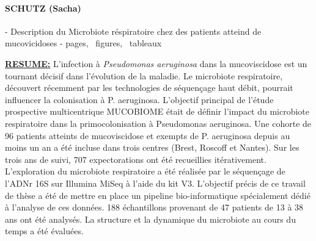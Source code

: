 \documentclass[12pt,a4paper]{article}
\begin{document}
{%



\clearpage


\newpage
\pagestyle{empty}

\noindent
\centering

\begin{minipage}[t][2cm]{15cm}
\paragraph{SCHUTZ (Sacha)} - Description du Microbiote réspiratoire chez des patients atteind de mucovicidoses - \pageref{LastPage} pages, \totalfigures\ figures, \totaltables\ tableaux \\
\end{minipage}


\begin{minipage}[t][9.5cm]{15cm}
\textbf{\underline{RESUME:}}
L'infection à \textit{Pseudomonas aeruginosa} dans la mucoviscidose est un tournant décisif dans l'évolution de la maladie. Le microbiote respiratoire, découvert récemment par les technologies de séquençage haut débit, pourrait influencer la colonisation à P. aeruginosa. 
L'objectif principal de l'étude prospective multicentrique MUCOBIOME était de définir l'impact du microbiote respiratoire dans la primocolonisation à Pseudomonas aeruginosa. Une cohorte de 96 patients atteints de mucoviscidose et exempts de P. aeruginosa depuis au moins un an a été incluse dans trois centres (Brest, Roscoff et Nantes). Sur les trois ans de suivi, 707 expectorations ont été recueillies itérativement. L'exploration du microbiote respiratoire a été réalisée par le séquençage de l'ADNr 16S sur Illumina MiSeq à l'aide du kit V3. L'objectif précis de ce travail de thèse a été de mettre en place un pipeline bio-informatique spécialement dédié à l'analyse de ces données. 188 échantillons provenant de 47 patients de 13 à 38 ans ont été analysés. La structure et la dynamique du microbiote au cours du temps a été évaluées. 
 \end{minipage}


}
\end{document}
